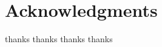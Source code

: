 \documentclass[10pt,letterpaper]{article}
\begin{document}

\section*{Acknowledgments}
thanks thanks thanks thanks

\nolinenumbers

%
%
% 


\end{document}
